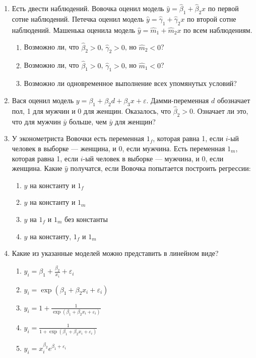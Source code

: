 \documentclass[pdftex,12pt,a4paper]{article}
\def \hb{\hat{\beta}}
\def \hy{\hat{y}}
\def \e{\varepsilon}
\newcommand{\solution}[1]{}
\begin{document}
\begin{enumerate}
\item Есть двести наблюдений. Вовочка оценил модель $\hy=\hb_1+\hb_2 x$ по первой сотне наблюдений. Петечка оценил модель $\hy=\hat{\gamma}_1+\hat{\gamma}_2 x$ по второй сотне наблюдений. Машенька оценила модель $\hy=\hat{m}_1+\hat{m}_2 x$ по всем наблюдениям.
\begin{enumerate}
\item Возможно ли, что $\hb_2>0$, $\hat{\gamma}_2>0$, но $\hat{m}_2<0$?
\item Возможно ли, что $\hb_1>0$, $\hat{\gamma}_1>0$, но $\hat{m}_1<0$?
\item Возможно ли одновременное выполнение всех упомянутых условий?
\end{enumerate}
\solution{да, возможно. Два вытянутых облачка точек. Первое облачко даёт первую регрессию, второе --- вторую. Прямая, соединяющая центры облачков, --- общую.}



\item Вася оценил модель $y=\beta_1+\beta_2 d+\beta_3 x+\varepsilon$. Дамми-переменная $d$ обозначает пол, 1 для мужчин и 0 для женщин. Оказалось, что $\hat{\beta}_2>0$. Означает ли это, что для мужчин $\bar{y}$ больше, чем $\bar{y}$ для женщин?
\solution{Нет. Коэффициенты можно интепретировать только <<при прочих равных>>, т.е. при равных $x$. Из-за разных $x$ может оказаться, что у мужчин $\bar{y}$ меньше, чем $\bar{y}$ для женщин.}

\item У эконометриста Вовочки есть переменная $1_f$, которая равна 1, если $i$-ый человек в выборке --- женщина, и 0, если мужчина. Есть переменная $1_m$, которая равна 1, если $i$-ый человек в выборке --- мужчина, и 0, если женщина. Какие $\hy$ получатся, если Вовочка попытается построить регрессии:
\begin{enumerate}
\item $y$ на константу и $1_f$
\item $y$ на константу и $1_m$
\item $y$ на $1_f$ и $1_m$ без константы
\item $y$ на константу, $1_f$ и $1_m$
\end{enumerate}

\item Какие из указанные моделей можно представить в линейном виде?
\begin{enumerate}
\item $y_i=\beta_1+\frac{\beta_2}{x_i}+\e_i$
\item $y_i=\exp(\beta_1+\beta_2 x_i+\e_i)$
\item $y_i=1+\frac{1}{\exp(\beta_1+\beta_2 x_i+\e_i)}$
\item $y_i=\frac{1}{1+\exp(\beta_1+\beta_2 x_i+\e_i)}$
\item $y_i=x_i^{\beta_2}e^{\beta_1+\e_i}$
\end{enumerate}
\solution{}

\end{enumerate}
\end{document}
